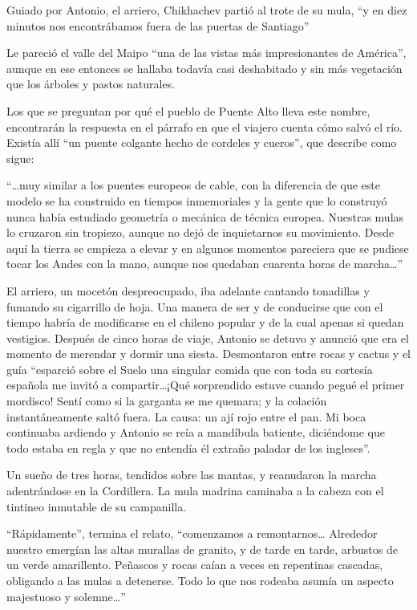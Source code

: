\documentclass[10pt,twoside,openright]{memoir}
\begin{document}
Guiado por Antonio, el arriero, Chikhachev partió al trote de su mula,
``y en diez minutos nos encontrábamos fuera de las puertas de Santiago''

Le pareció el valle del Maipo ``una de las vistas más impresionantes de
América'', aunque en ese entonces se hallaba todavía casi deshabitado y
sin más vegetación que los árboles y pastos naturales.

Los que se preguntan por qué el pueblo de Puente Alto lleva este nombre,
encontrarán la respuesta en el párrafo en que el viajero cuenta cómo
salvó el río. Existía allí ``un puente colgante hecho de cordeles y
cueros'', que describe como sigue:

``\ldots{}muy similar a los puentes europeos de cable, con la diferencia
de que este modelo se ha construido en tiempos inmemoriales y la gente
que lo construyó nunca había estudiado geometría o mecánica de técnica
europea. Nuestras mulas lo cruzaron sin tropiezo, aunque no dejó de
inquietarnos su movimiento. Desde aquí la tierra se empieza a elevar y
en algunos momentos pareciera que se pudiese tocar los Andes con la
mano, aunque nos quedaban cuarenta horas de marcha\ldots''

El arriero, un mocetón despreocupado, iba adelante cantando tonadillas y
fumando su cigarrillo de hoja. Una manera de ser y de conducirse que con
el tiempo habría de modificarse en el chileno popular y de la cual
apenas si quedan vestigios. Después de cinco horas de viaje, Antonio se
detuvo y anunció que era el momento de merendar y dormir una siesta.
Desmontaron entre rocas y cactus y el guía ``esparció sobre el Suelo una
singular comida que con toda su cortesía española me invitó a
compartir\ldots ¡Qué sorprendido estuve cuando pegué el primer mordisco!
Sentí como si la garganta se me quemara; y la colación instantáneamente
saltó fuera. La causa: un ají rojo entre el pan. Mi boca continuaba
ardiendo y Antonio se reía a mandíbula batiente, diciéndome que todo
estaba en regla y que no entendía él extraño paladar de los ingleses''.

Un sueño de tres horas, tendidos sobre las mantas, y reanudaron la
marcha adentrándose en la Cordillera. La mula madrina caminaba a la
cabeza con el tintineo inmutable de su campanilla.

``Rápidamente'', termina el relato, ``comenzamos a remontarnos\ldots
Alrededor nuestro emergían las altas murallas de granito, y de tarde en
tarde, arbustos de un verde amarillento. Peñascos y rocas caían a veces
en repentinas cascadas, obligando a las mulas a detenerse. Todo lo que
nos rodeaba asumía un aspecto majestuoso y solemne\ldots''
\end{document}
